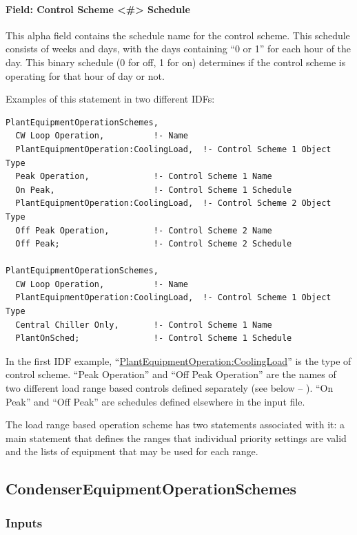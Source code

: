 \paragraph{Field: Control Scheme \textless{}\#\textgreater{} Schedule}\label{field-control-scheme-schedule}

This alpha field contains the schedule name for the control scheme. This schedule consists of weeks and days, with the days containing ``0 or 1'' for each hour of the day. This binary schedule (0 for off, 1 for on) determines if the control scheme is operating for that hour of day or not.

Examples of this statement in two different IDFs:

\begin{lstlisting}
PlantEquipmentOperationSchemes,
  CW Loop Operation,          !- Name
  PlantEquipmentOperation:CoolingLoad,  !- Control Scheme 1 Object Type
  Peak Operation,             !- Control Scheme 1 Name
  On Peak,                    !- Control Scheme 1 Schedule
  PlantEquipmentOperation:CoolingLoad,  !- Control Scheme 2 Object Type
  Off Peak Operation,         !- Control Scheme 2 Name
  Off Peak;                   !- Control Scheme 2 Schedule

PlantEquipmentOperationSchemes,
  CW Loop Operation,          !- Name
  PlantEquipmentOperation:CoolingLoad,  !- Control Scheme 1 Object Type
  Central Chiller Only,       !- Control Scheme 1 Name
  PlantOnSched;               !- Control Scheme 1 Schedule
\end{lstlisting}

In the first IDF example, ``\hyperref[plantequipmentoperationcoolingload]{PlantEquipmentOperation:CoolingLoad}'' is the type of control scheme. ``Peak Operation'' and ``Off Peak Operation'' are the names of two different load range based controls defined separately (see below -- ). ``On Peak'' and ``Off Peak'' are schedules defined elsewhere in the input file.

The load range based operation scheme has two statements associated with it: a main statement that defines the ranges that individual priority settings are valid and the lists of equipment that may be used for each range.

\subsection{CondenserEquipmentOperationSchemes}\label{condenserequipmentoperationschemes}

\subsubsection{Inputs}\label{inputs-1-030}

